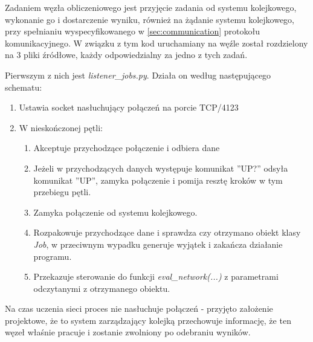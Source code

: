 Zadaniem węzła obliczeniowego jest przyjęcie zadania od systemu kolejkowego, wykonanie go i dostarczenie wyniku, również na żądanie systemu kolejkowego, przy spełnianiu wyspecyfikowanego w \ref{sec:communication} protokołu komunikacyjnego.
W związku z tym kod uruchamiany na węźle został rozdzielony na 3 pliki źródłowe, każdy odpowiedzialny za jedno z tych zadań.

Pierwszym z nich jest \textit{listener\_jobs.py}.
Działa on według następującego schematu:
\begin{enumerate}
  \item Ustawia socket nasłuchujący połączeń na porcie TCP/4123
  \item W nieskończonej pętli:
  \begin{enumerate}
    \item Akceptuje przychodzące połączenie i odbiera dane
    \item Jeżeli w przychodzących danych występuje komunikat ''UP?'' odsyła komunikat ''UP'', zamyka połączenie i pomija resztę kroków w tym przebiegu pętli.
    \item Zamyka połączenie od systemu kolejkowego.
    \item Rozpakowuje przychodzące dane i sprawdza czy otrzymano obiekt klasy \textit{Job}, w przeciwnym wypadku generuje wyjątek i zakańcza działanie programu.
    \item Przekazuje sterowanie do funkcji \textit{eval\_network(...)} z parametrami odczytanymi z otrzymanego obiektu.
  \end{enumerate}
\end{enumerate}

Na czas uczenia sieci proces nie nasłuchuje połączeń - przyjęto założenie projektowe, że to system zarządzający kolejką przechowuje informację, że ten węzeł właśnie pracuje i zostanie zwolniony po odebraniu wyników.

